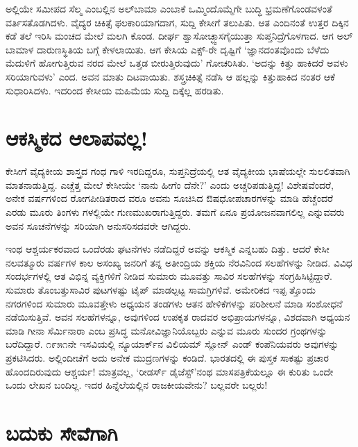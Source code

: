 ಅಲ್ಲಿಯೇ ಸಮೀಪದ ಸೆಲ್ಮ ಎಂಬಲ್ಲಿನ ಅಲ್​ಬಾಮಾ ಎಂಬಾಕೆ ಒಮ್ಮಿಂದೊಮ್ಮೆಗೇ ಬುದ್ಧಿ ಭ್ರಮಣೆಗೊಂಡವಳಂತೆ ವರ್ತಿಸತೊಡಗಿದಳು. ವೈದ್ಯರ ಚಿಕಿತ್ಸೆ ಫಲಕಾರಿಯಾಗದಾಗ, ಸುದ್ದಿ ಕೇಸೀಗೆ ತಲುಪಿತು. ಆತ ಎಂದಿನಂತೆ ಉತ್ತರ ದಿಕ್ಕಿನ ಕಡೆ ತಲೆ ಇರಿಸಿ ಮಂಚದ ಮೇಲೆ ಮಲಗಿ ಕೊಂಡ. ದೀರ್ಘ ಶ್ವಾಸೋಚ್ಛ್ವಾಸಗೈಯುತ್ತಾ ಸುಪ್ತನಿದ್ರೆಗೊಳಗಾದ. ಆಗ ಅಲ್​ಬಾಮಾಳ ದಾರುಣಸ್ಥಿತಿಯ ಬಗ್ಗೆ ಕೇಳಲಾಯಿತು. ಆಗ ಕೇಸಿಯ ಎಕ್ಸ್​-ರೇ ದೃಷ್ಟಿಗೆ ‘ಜ್ಞಾನದಂತವೊಂದು ಬೆಳೆದು ಮೆದುಳಿಗೆ ಹೋಗುತ್ತಿರುವ ನರದ ಮೇಲೆ ಒತ್ತಡ ಬೀರುತ್ತಿರುವುದು’ ಗೋಚರಿಸಿತು. ‘ಅದನ್ನು ಕಿತ್ತು ಹಾಕಿದರೆ ಅವಳು ಸರಿಯಾಗುವಳು’ ಎಂದ. ಅವನ ಮಾತು ದಿಟವಾಯಿತು. ಶಸ್ತ್ರಚಿಕಿತ್ಸೆ ನಡೆಸಿ ಆ ಹಲ್ಲನ್ನು ಕಿತ್ತುಹಾಕಿದ ನಂತರ ಆಕೆ ಸುಧಾರಿಸಿದಳು. ಇದರಿಂದ ಕೇಸೀಯ ಮಹಿಮೆಯ ಸುದ್ದಿ ದಿಕ್ಕೆಲ್ಲ ಹರಡಿತು.


\section{ಆಕಸ್ಮಿಕದ ಆಲಾಪವಲ್ಲ!}

ಕೇಸೀಗೆ ವೈದ್ಯಕೀಯ ಶಾಸ್ತ್ರದ ಗಂಧ ಗಾಳಿ ಇರದಿದ್ದರೂ, ಸುಪ್ತನಿದ್ರೆಯಲ್ಲಿ ಆತ ವೈದ್ಯಕೀಯ ಭಾಷೆಯಲ್ಲೇ ಸುಲಲಿತವಾಗಿ ಮಾತನಾಡುತ್ತಿದ್ದ. ಎಚ್ಚೆತ್ತ ಮೇಲೆ ಕೇಸೀಯೇ ‘ನಾನು ಹೀಗೆಂ ದೆನೇ?’ ಎಂದು ಅಚ್ಚರಿಪಡುತ್ತಿದ್ದ! ವಿಶೇಷವೆಂದರೆ, ಅನೇಕ ವರ್ಷಗಳಿಂದ ರೋಗಪೀಡಿತರಾದ ವರೂ ಅವನು ಸೂಚಿಸಿದ ಔಷಧೋಪಚಾರಗಳನ್ನು ಮಾಡಿ ಹೆಚ್ಚೆಂದರೆ ಎರಡು ಮೂರು ತಿಂಗಳು ಗಳಲ್ಲಿಯೇ ಗುಣಮುಖರಾಗುತ್ತಿದ್ದರು. ತಮಗೆ ಏನೂ ಪ್ರಯೋಜನವಾಗಲಿಲ್ಲ ಎನ್ನುವವರು ಅವನ ಸೂಚನೆಗಳನ್ನು ಸರಿಯಾಗಿ ಅನುಸರಿಸದವರೇ ಆಗಿದ್ದರು.

ಇಂಥ ಆಶ್ಚರ್ಯಕರವಾದ ಒಂದೆರಡು ಘಟನೆಗಳು ನಡೆದಿದ್ದರೆ ಅವನ್ನು ಆಕಸ್ಮಿಕ ಎನ್ನಬಹು ದಿತ್ತು. ಆದರೆ ಕೇಸೀ ನಲವತ್ಮೂರು ವರ್ಷಗಳ ಕಾಲ ಅಸಂಖ್ಯ ಜನರಿಗೆ ತನ್ನ ಅತೀಂದ್ರಿಯ ಶಕ್ತಿಯ ನೆರವಿನಿಂದ ಸಲಹೆಗಳನ್ನು ನೀಡಿದ. ವಿವಿಧ ಸಂದರ್ಭಗಳಲ್ಲಿ ಆತ ವಿಭಿನ್ನ ವ್ಯಕ್ತಿಗಳಿಗೆ ನೀಡಿದ ಸುಮಾರು ಮೂವತ್ತು ಸಾವಿರ ಸಲಹೆಗಳನ್ನು ಸಂಗ್ರಹಿಸಿಟ್ಟಿದ್ದಾರೆ. ಸುಮಾರು ತೊಂಬತ್ತುಸಾವಿರ ಪುಟಗಳಷ್ಟು ಟೈಪ್ ಮಾಡಲ್ಪಟ್ಟ ಸಾಮಗ್ರಿಗಳಿವೆ. ಅಮೇರಿಕದ ಇಪ್ಪ ತ್ತೊಂದು ನಗರಗಳಿಂದ ಸುಮಾರು ಮೂವತ್ತೇಳು ಅಧ್ಯಯನ ತಂಡಗಳು ಆತನ ಹೇಳಿಕೆಗಳನ್ನು ಪರಿಶೀಲನೆ ಮಾಡಿ ಸಂಶೋಧನೆ ನಡೆಯಿಸುತ್ತಿವೆ. ಅವನ ಸಲಹೆಗಳನ್ನೂ, ಅವುಗಳಿಂದ ಉಪಕೃತ ರಾದವರ ಅಭಿಪ್ರಾಯಗಳನ್ನೂ, ವಿಶದವಾಗಿ ಅಧ್ಯಯನ ಮಾಡಿ ಗೀನಾ ಸೆರ್ಮಿನಾರಾ ಎಂಬ ಪ್ರಸಿದ್ಧ ಮನೋವಿಜ್ಞಾನಿಯೊಬ್ಬರು  ಎನ್ನುವ ಮೂರು ಸುಂದರ ಗ್ರಂಥಗಳನ್ನು ಬರೆದಿದ್ದಾರೆ. ೧೯೫೧ನೇ ಇಸವಿಯಲ್ಲಿ ನ್ಯೂಯಾರ್ಕ್​ನ ವಿಲಿಯಮ್ ಸ್ಲೋನ್ ಎಂಡ್ ಕಂಪೆನಿಯವರು ಅವುಗಳನ್ನು ಪ್ರಕಟಿಸಿದರು. ಅಲ್ಲಿಂದೀಚೆಗೆ ಅದು ಅನೇಕ ಮುದ್ರಣಗಳನ್ನು ಕಂಡಿದೆ. ಭಾರತದಲ್ಲಿ ಈ ಪುಸ್ತಕ ಸಾಕಷ್ಟು ಪ್ರಚಾರ ಹೊಂದದಿರುವುದು ಆಶ್ಚರ್ಯ! ಮಾತ್ರವಲ್ಲ, ‘ರೀಡರ್ಸ್ ಡೈಜೆಸ್ಟ್​’ನಂಥ ಮಾಸಪತ್ರಿಕೆಯಲ್ಲೂ ಈ ಕುರಿತು ಒಂದೇ ಒಂದು ಲೇಖನ ಬಂದಿಲ್ಲ. ಇದರ ಹಿನ್ನೆಲೆಯಲ್ಲಿನ ರಾಜಕೀಯವೇನು? ಬಲ್ಲವರೇ ಬಲ್ಲರು!


\section{ಬದುಕು ಸೇವೆಗಾಗಿ}

